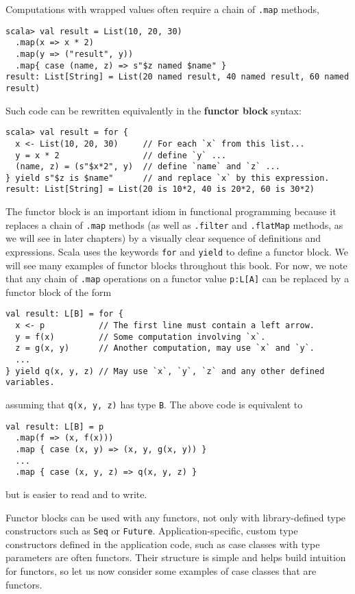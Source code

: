 Computations with wrapped values often require a chain of \lstinline!.map!
methods,
\begin{lstlisting}
scala> val result = List(10, 20, 30)
  .map(x => x * 2)
  .map(y => ("result", y))
  .map{ case (name, z) => s"$z named $name" }
result: List[String] = List(20 named result, 40 named result, 60 named result)
\end{lstlisting}
Such code can be rewritten equivalently in the \textbf{functor
block} syntax:
\begin{lstlisting}
scala> val result = for {
  x <- List(10, 20, 30)     // For each `x` from this list...
  y = x * 2                 // define `y` ...
  (name, z) = (s"$x*2", y)  // define `name` and `z` ...
} yield s"$z is $name"      // and replace `x` by this expression. 
result: List[String] = List(20 is 10*2, 40 is 20*2, 60 is 30*2)
\end{lstlisting}
The functor block is an important idiom in functional programming
because it replaces a chain of \lstinline!.map! methods (as well
as \lstinline!.filter! and \lstinline!.flatMap! methods, as we will
see in later chapters) by a visually clear sequence of definitions
and expressions. Scala uses the keywords \lstinline!for! and \lstinline!yield!
to define a functor block. We will see many examples of functor blocks
throughout this book. For now, we note that any chain of \lstinline!.map!
operations on a functor value \lstinline!p:L[A]! can be replaced
by a functor block of the form
\begin{lstlisting}
val result: L[B] = for {
  x <- p           // The first line must contain a left arrow.
  y = f(x)         // Some computation involving `x`.
  z = g(x, y)      // Another computation, may use `x` and `y`.
  ...
} yield q(x, y, z) // May use `x`, `y`, `z` and any other defined variables.
\end{lstlisting}
assuming that \lstinline!q(x, y, z)! has type \lstinline!B!. The
above code is equivalent to
\begin{lstlisting}
val result: L[B] = p
  .map(f => (x, f(x)))
  .map { case (x, y) => (x, y, g(x, y)) }
  ...
  .map { case (x, y, z) => q(x, y, z) }
\end{lstlisting}
but is easier to read and to write.

Functor blocks can be used with any functors, not only with library-defined
type constructors such as \lstinline!Seq! or \lstinline!Future!.
Application-specific, custom type constructors defined in the application
code, such as case classes with type parameters are often functors.
Their structure is simple and helps build intuition for functors,
so let us now consider some examples of case classes that are functors.

